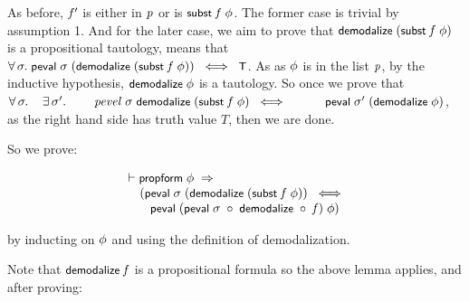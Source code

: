 \documentclass{report}
\renewcommand{\HOLConst}[1]{{\textsf{\upshape\small #1}}}
\renewcommand{\HOLinline}[1]{\ensuremath{#1}}
\newenvironment{holmath}{\begin{displaymath}\begin{array}{l}}{\end{array}\end{displaymath}\ignorespacesafterend}
\begin{document}
As before, \HOLinline{\HOLFreeVar{f\sp{\prime}}} is either in \HOLinline{\HOLFreeVar{p}} or is \HOLinline{\HOLConst{subst}\;\HOLFreeVar{f}\;\HOLFreeVar{\ensuremath{\phi}}}. The former case is trivial by assumption 1. And for the later case, we aim to prove that \HOLinline{\HOLConst{demodalize}\;(\HOLConst{subst}\;\HOLFreeVar{f}\;\HOLFreeVar{\ensuremath{\phi}})} is a propositional tautology, means that \HOLinline{\HOLSymConst{\HOLTokenForall{}}\HOLBoundVar{\ensuremath{\sigma}}.\;\HOLConst{peval}\;\HOLBoundVar{\ensuremath{\sigma}}\;(\HOLConst{demodalize}\;(\HOLConst{subst}\;\HOLFreeVar{f}\;\HOLFreeVar{\ensuremath{\phi}}))\;\HOLSymConst{\HOLTokenEquiv{}}\;\HOLConst{T}}. As as \HOLinline{\HOLFreeVar{\ensuremath{\phi}}} is in the list \HOLinline{\HOLFreeVar{p}}, by the inductive hypothesis, \HOLinline{\HOLConst{demodalize}\;\HOLFreeVar{\ensuremath{\phi}}} is a tautology. So once we prove that \HOLinline{\HOLSymConst{\HOLTokenForall{}}\HOLBoundVar{\ensuremath{\sigma}}.\\
\;\;\;\;\HOLSymConst{\HOLTokenExists{}}\HOLBoundVar{\ensuremath{\sigma}\sp{\prime}}.\\
\;\;\;\;\;\;\;\;\HOLFreeVar{pevel}\;\HOLBoundVar{\ensuremath{\sigma}}\;\HOLConst{demodalize}\;(\HOLConst{subst}\;\HOLFreeVar{f}\;\HOLFreeVar{\ensuremath{\phi}})\;\HOLSymConst{\HOLTokenEquiv{}}\\
\;\;\;\;\;\;\;\;\;\;\HOLConst{peval}\;\HOLBoundVar{\ensuremath{\sigma}\sp{\prime}}\;(\HOLConst{demodalize}\;\HOLFreeVar{\ensuremath{\phi}})}, as the right hand side has truth value $T$, then we are done.

So we prove:

\begin{holmath}
  \ensuremath{\HOLTokenTurnstile}\HOLConst{propform}\;\HOLFreeVar{\ensuremath{\phi}}\;\HOLSymConst{\HOLTokenImp{}}\\
\;\;\;\;\;(\HOLConst{peval}\;\HOLFreeVar{\ensuremath{\sigma}}\;(\HOLConst{demodalize}\;(\HOLConst{subst}\;\HOLFreeVar{f}\;\HOLFreeVar{\ensuremath{\phi}}))\;\HOLSymConst{\HOLTokenEquiv{}}\\
\;\;\;\;\;\;\;\;\HOLConst{peval}\;(\HOLConst{peval}\;\HOLFreeVar{\ensuremath{\sigma}}\;\HOLSymConst{\HOLTokenCompose}\;\HOLConst{demodalize}\;\HOLSymConst{\HOLTokenCompose}\;\HOLFreeVar{f})\;\HOLFreeVar{\ensuremath{\phi}})
\end{holmath}

by inducting on \HOLinline{\HOLFreeVar{\ensuremath{\phi}}} and using the definition of demodalization.

Note that \HOLinline{\HOLConst{demodalize}\;\HOLFreeVar{f}} is a propositional formula so the above lemma applies, and after proving:
\end{document}
